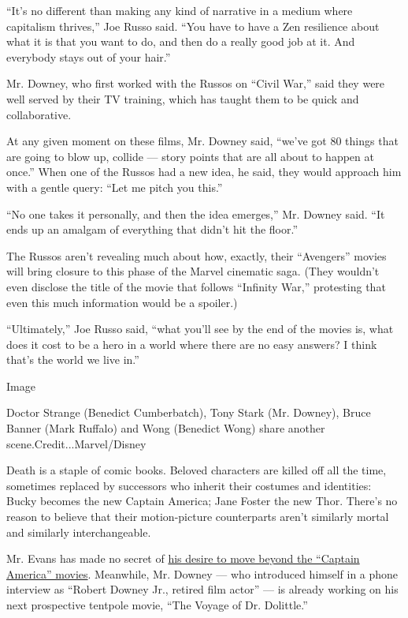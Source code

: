 ``It's no different than making any kind of narrative in a medium where
capitalism thrives,'' Joe Russo said. ``You have to have a Zen
resilience about what it is that you want to do, and then do a really
good job at it. And everybody stays out of your hair.''

Mr. Downey, who first worked with the Russos on ``Civil War,'' said they
were well served by their TV training, which has taught them to be quick
and collaborative.

At any given moment on these films, Mr. Downey said, ``we've got 80
things that are going to blow up, collide --- story points that are all
about to happen at once.'' When one of the Russos had a new idea, he
said, they would approach him with a gentle query: ``Let me pitch you
this.''

``No one takes it personally, and then the idea emerges,'' Mr. Downey
said. ``It ends up an amalgam of everything that didn't hit the floor.''

The Russos aren't revealing much about how, exactly, their ``Avengers''
movies will bring closure to this phase of the Marvel cinematic saga.
(They wouldn't even disclose the title of the movie that follows
``Infinity War,'' protesting that even this much information would be a
spoiler.)

``Ultimately,'' Joe Russo said, ``what you'll see by the end of the
movies is, what does it cost to be a hero in a world where there are no
easy answers? I think that's the world we live in.''

Image

Doctor Strange (Benedict Cumberbatch), Tony Stark (Mr. Downey), Bruce
Banner (Mark Ruffalo) and Wong (Benedict Wong) share another
scene.Credit...Marvel/Disney

Death is a staple of comic books. Beloved characters are killed off all
the time, sometimes replaced by successors who inherit their costumes
and identities: Bucky becomes the new Captain America; Jane Foster the
new Thor. There's no reason to believe that their motion-picture
counterparts aren't similarly mortal and similarly interchangeable.

Mr. Evans has made no secret of
\href{https://www.nytimes3xbfgragh.onion/2018/03/22/theater/chris-evans-lobby-hero-captain-america.html}{his
desire to move beyond the ``Captain America'' movies}. Meanwhile, Mr.
Downey --- who introduced himself in a phone interview as ``Robert
Downey Jr., retired film actor'' --- is already working on his next
prospective tentpole movie, ``The Voyage of Dr. Dolittle.''

